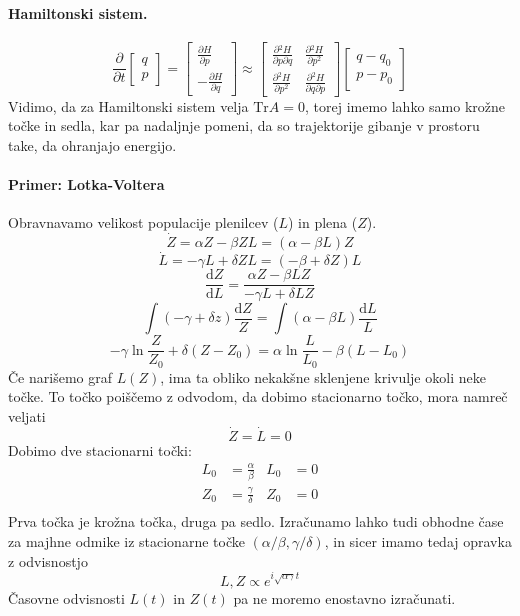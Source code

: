 \documentclass[a4paper]{article}
\newcommand{\dif}{\mathrm{d}}
\newcommand{\pd}[2]{\frac{\partial {#1}}{\partial {#2}}}
\newcommand{\dd}[2]{\frac{\mathrm{d} {#1}}{\mathrm{d} {#2}}}
\begin{document}
\paragraph{Hamiltonski sistem.}
$$\pd{}{t}\begin{bmatrix}
    q \\ p
\end{bmatrix} = \begin{bmatrix}
    \pd{H}{p} \\ - \pd{H}{q}
\end{bmatrix} \approx \begin{bmatrix}
    \pd{^2 H}{p \partial q} & \pd{^2 H}{p^2} \\
    \pd{^2 H}{p^2} & \pd{^2 H}{q \partial p}
\end{bmatrix}\begin{bmatrix}
    q-q_0 \\ p-p_0
\end{bmatrix}$$
Vidimo, da za Hamiltonski sistem velja $\mathrm{Tr}A = 0$, torej imemo lahko samo krožne točke in sedla, kar pa nadaljnje pomeni,
da so trajektorije gibanje v prostoru take, da ohranjajo energijo.
\paragraph{Primer: Lotka-Voltera} Obravnavamo velikost populacije plenilcev ($L$) in plena ($Z$).
$$\dot{Z} = \alpha Z - \beta ZL = (\alpha - \beta L) Z$$
$$\dot{L} = -\gamma L + \delta ZL = (-\beta + \delta Z) L$$
$$\dd{Z}{L} = \frac{\alpha Z - \beta LZ}{-\gamma L + \delta LZ}$$
$$\int (-\gamma + \delta z) \frac{\dif Z}{Z} = \int (\alpha - \beta L)\frac{\dif L}{L}$$
$$-\gamma \ln\frac{Z}{Z_0} + \delta (Z - Z_0) = \alpha \ln\frac{L}{L_0} - \beta (L-L_0)$$
Če narišemo graf $L(Z)$, ima ta obliko nekakšne sklenjene krivulje okoli neke točke. To točko poiščemo z odvodom, da dobimo stacionarno točko, mora namreč veljati
$$\dot Z = \dot L = 0$$
Dobimo dve stacionarni točki:
\begin{align*}
    L_0 & = \frac{\alpha}{\beta} & L_0 & = 0 \\
    Z_0 & = \frac{\gamma}{\delta} & Z_0 & = 0 \\
\end{align*}
Prva točka je krožna točka, druga pa sedlo. Izračunamo lahko tudi obhodne čase za majhne odmike iz stacionarne točke $(\alpha/\beta, \gamma/\delta)$, in sicer imamo tedaj opravka z odvisnostjo $$L, Z \propto e^{i\sqrt{\alpha\gamma}t}$$
Časovne odvisnosti $L(t)$ in $Z(t)$ pa ne moremo enostavno izračunati.
\end{document}
